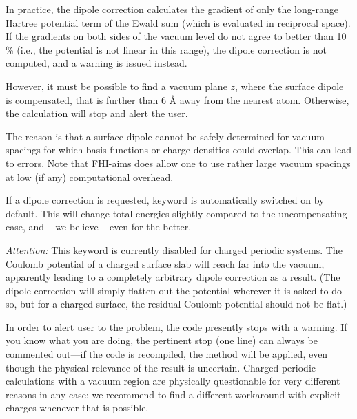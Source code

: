 In practice, the dipole correction calculates the gradient of only 
the long-range Hartree potential term of the Ewald sum (which is evaluated in
reciprocal space). If the gradients on both sides of the vacuum level do not
agree to better than 10 \% (i.e., the potential is not linear in this range),
the dipole correction is not computed, and a warning is issued instead.

However, it must be possible to find a vacuum plane $z$, where the
surface dipole is compensated, that is further than 6 {\AA} away from
the nearest atom. Otherwise, the calculation will stop and alert the user.

The reason is that a surface dipole cannot be safely determined for
vacuum spacings for which basis functions or charge densities could
overlap. This can lead to errors. Note that FHI-aims does allow one to use
rather large vacuum spacings at low (if any) computational overhead.

If a dipole correction is requested, keyword
 is automatically switched
on by default. This will change total energies slightly compared to
the uncompensating case, and -- we believe -- even for the better. 

\emph{Attention:} This keyword is currently disabled for charged periodic
systems. The Coulomb potential of a charged surface slab will reach
far into the vacuum, apparently leading to a completely arbitrary
dipole correction as a result. (The dipole correction will simply
flatten out the potential wherever it is asked 
to do so, but for a charged surface, the residual Coulomb potential should not
be flat.) 

In order to alert user to the problem, the code presently stops
with a warning. If you know what you are doing, the pertinent stop (one line)
can always be commented out---if the code is recompiled, the method will be
applied, even though the physical relevance of the result is
uncertain. Charged periodic calculations with a
vacuum region are physically questionable for very different reasons
in any case; we recommend to find a different workaround with explicit
charges whenever that is possible.


